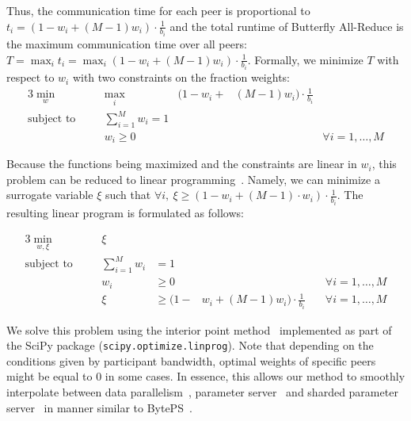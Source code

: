 Thus, the communication time for each peer is proportional to $t_i = (1-w_i+(M-1) w_i) \cdot \frac{1}{b_i}$ and the total runtime of Butterfly All-Reduce is the maximum communication time over all peers: $T = \max_i t_i=\max_i (1-w_i+(M-1) w_i) \cdot \frac{1}{b_i}$. Formally, we minimize $T$ with respect to $w_i$ with two constraints on the fraction weights:
\begin{alignat*}{3}
\min_w&\quad &\max_i &(1-w_i +&(M-1)w_i)\cdot\frac{1}{b_i}&\\
\text{subject to}&\quad& \sum_{i=1}^M w_i = 1&&&\\
&&w_i \geq 0 &&&\forall i=1,\ldots,M
\end{alignat*}

Because the functions being maximized and the constraints are linear in $w_i$, this problem can be reduced to linear programming~\cite{kaplan1974application}. Namely, we can minimize a surrogate variable $\xi$ such that $\forall i, \ \xi \geq (1-w_i+(M-1)\cdot w_i) \cdot \frac{1}{b_i}$. The resulting linear program is formulated as follows:

\begin{alignat*}{3}
\min_{w,\xi}&\quad& \xi && &\\
\text{subject to}&\quad& \sum_{i=1}^M w_i& = 1 &&\\
&\quad& w_i& \geq 0 &&\quad \forall i=1,\ldots,M\\
&\quad&\xi&\geq (1-&w_i+(M-1)w_i)\cdot\frac{1}{b_i}&\quad\forall i=1,\ldots,M
\end{alignat*}

We solve this problem using the interior point method~\cite{andersen} implemented as part of the SciPy package (\texttt{scipy.optimize.linprog}).
Note that depending on the conditions given by participant bandwidth, optimal weights of specific peers might be equal to 0 in some cases. In essence, this allows our method to smoothly interpolate between data parallelism~\cite{valiant1990bridging}, parameter server~\cite{parameter_server_first} and sharded parameter server~\cite{sharded_ps_first} in manner similar to BytePS~\cite{byteps}.